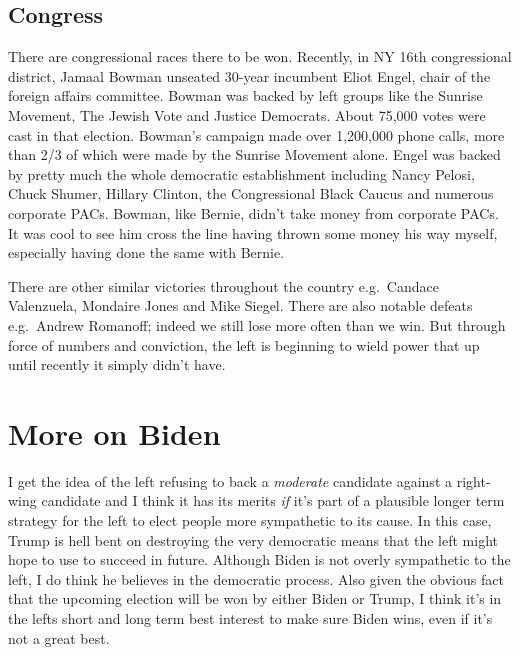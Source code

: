 \documentclass[]{book}
\begin{document}
\hypertarget{congress}{%
\section{Congress}\label{congress}}

There are congressional races there to be won. Recently, in NY 16th congressional district, Jamaal Bowman unseated 30-year incumbent Eliot Engel, chair of the foreign affairs committee. Bowman was backed by left groups like the Sunrise Movement, The Jewish Vote and Justice Democrats. About 75,000 votes were cast in that election. Bowman's campaign made over 1,200,000 phone calls, more than 2/3 of which were made by the Sunrise Movement alone. Engel was backed by pretty much the whole democratic establishment including Nancy Pelosi, Chuck Shumer, Hillary Clinton, the Congressional Black Caucus and numerous corporate PACs. Bowman, like Bernie, didn't take money from corporate PACs. It was cool to see him cross the line having thrown some money his way myself, especially having done the same with Bernie.

There are other similar victories throughout the country e.g.~Candace Valenzuela, Mondaire Jones and Mike Siegel. There are also notable defeats e.g.~Andrew Romanoff; indeed we still lose more often than we win. But through force of numbers and conviction, the left is beginning to wield power that up until recently it simply didn't have.

\hypertarget{more-on-biden}{%
\chapter{More on Biden}\label{more-on-biden}}

I get the idea of the left refusing to back a \emph{moderate} candidate against a right-wing candidate and I think it has its merits \emph{if} it's part of a plausible longer term strategy for the left to elect people more sympathetic to its cause. In this case, Trump is hell bent on destroying the very democratic means that the left might hope to use to succeed in future. Although Biden is not overly sympathetic to the left, I do think he believes in the democratic process. Also given the obvious fact that the upcoming election will be won by either Biden or Trump, I think it's in the lefts short and long term best interest to make sure Biden wins, even if it's not a great best.


\end{document}
